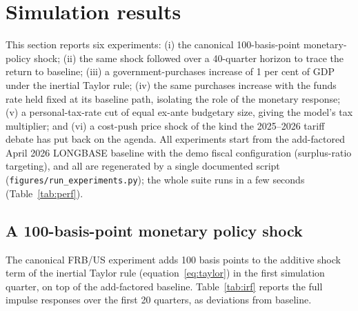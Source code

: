 \section{Simulation results}
\label{sec:results}

This section reports six experiments: (i) the canonical 100-basis-point monetary-policy shock; (ii) the same shock followed over a 40-quarter horizon to trace the return to baseline; (iii) a government-purchases increase of 1 per cent of GDP under the inertial Taylor rule; (iv) the same purchases increase with the funds rate held fixed at its baseline path, isolating the role of the monetary response; (v) a personal-tax-rate cut of equal ex-ante budgetary size, giving the model's tax multiplier; and (vi) a cost-push price shock of the kind the 2025--2026 tariff debate has put back on the agenda. All experiments start from the add-factored April 2026 LONGBASE baseline with the demo fiscal configuration (surplus-ratio targeting), and all are regenerated by a single documented script (\texttt{figures/run\_experiments.py}); the whole suite runs in a few seconds (Table~\ref{tab:perf}).

\subsection{A 100-basis-point monetary policy shock}

The canonical FRB/US experiment adds 100 basis points to the additive shock term of the inertial Taylor rule (equation~\ref{eq:taylor}) in the first simulation quarter, on top of the add-factored baseline. Table~\ref{tab:irf} reports the full impulse responses over the first 20 quarters, as deviations from baseline.


